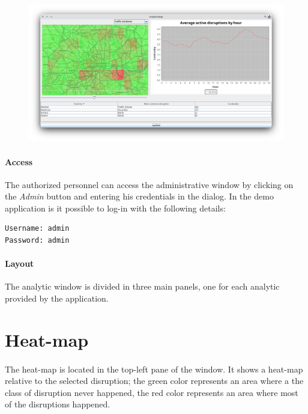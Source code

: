 \begin{figure}[H]
	\centering
	\includegraphics[width=\linewidth]{assets/anayitics0.png}
	\caption[]{}
	\label{fig:anal0}
\end{figure}

\paragraph{Access}
The authorized personnel can access the administrative window by clicking on 
the \textit{Admin} button and entering his credentials in the dialog. In the 
demo application is it possible to log-in with the following details:

\begin{lstlisting}[numbers=none, frame=single]
Username: admin
Password: admin
\end{lstlisting}

\paragraph{Layout}
The analytic window is divided in three main panels, one for each analytic 
provided by the application.

\section{Heat-map}

\paragraph{}
The heat-map is located in the top-left pane of the window. It shows a heat-map 
relative to the selected disruption; the green color represents an area where a 
the class of disruption never happened, the red color represents an area where 
most of the disruptions happened.

